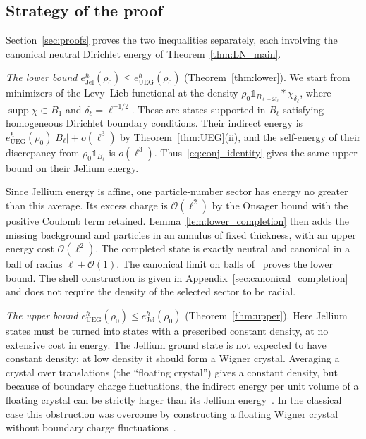 \documentclass[final,reqno]{amsart}
\DeclareMathOperator{\supp}{supp}
\theoremstyle{remark}
\theoremstyle{definition}
\renewcommand{\le}{\leqslant}
\newcommand{\iden}{\mathbb{1}}
\newcommand{\UEG}{\mathrm{UEG}}
\newcommand{\Jel}{\mathrm{Jel}}
\begin{document}
\subsection{Strategy of the proof}\label{sec:main_strategy}

Section~\ref{sec:proofs} proves the two inequalities separately, each involving the canonical neutral Dirichlet energy of Theorem~\ref{thm:LN_main}.

\medskip
\noindent\emph{The lower bound $e^\hbar_\Jel(\rho_0)\le e^\hbar_\UEG(\rho_0)$} (Theorem~\ref{thm:lower}).
We start from minimizers of the Levy--Lieb functional at the density $\rho_0\iden_{B_{\ell-2\delta_\ell}}*\chi_{\delta_\ell}$, where $\supp\chi\subset B_1$ and $\delta_\ell=\ell^{-1/2}$. These are states supported in $B_\ell$ satisfying homogeneous Dirichlet boundary conditions. Their indirect energy is $e^\hbar_\UEG(\rho_0)|B_\ell|+o(\ell^3)$ by Theorem~\ref{thm:UEG}(ii), and the self-energy of their discrepancy from $\rho_0\iden_{B_\ell}$ is $o(\ell^3)$. Thus~\eqref{eq:conj_identity} gives the same upper bound on their Jellium energy.

Since Jellium energy is affine, one particle-number sector has energy no greater than this average. Its excess charge is $\mathcal O(\ell^2)$ by the Onsager bound with the positive Coulomb term retained. Lemma~\ref{lem:lower_completion} then adds the missing background and particles in an annulus of fixed thickness, with an upper energy cost $\mathcal O(\ell^2)$. The completed state is exactly neutral and canonical in a ball of radius $\ell+\mathcal O(1)$. The canonical limit on balls of~\cite{lieb1975thermodynamic} proves the lower bound. The shell construction is given in Appendix~\ref{sec:canonical_completion} and does not require the density of the selected sector to be radial.

\medskip
\noindent\emph{The upper bound $e^\hbar_\UEG(\rho_0)\le e^\hbar_\Jel(\rho_0)$} (Theorem~\ref{thm:upper}).
Here Jellium states must be turned into states with a prescribed constant density, at no extensive cost in energy. The Jellium ground state is not expected to have constant density; at low density it should form a Wigner crystal. Averaging a crystal over translations (the ``floating crystal'') gives a constant density, but because of boundary charge fluctuations, the indirect energy per unit volume of a floating crystal can be strictly larger than its Jellium energy~\cite[Appendix~B]{lewin2015improved}. In the classical case this obstruction was overcome by constructing a floating Wigner crystal without boundary charge fluctuations~\cite{lewin2019floating}.
\end{document}
